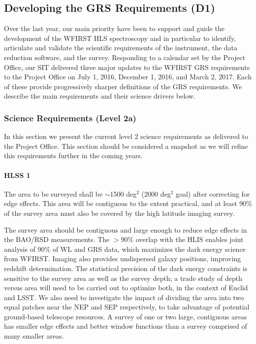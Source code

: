  \subsection{Developing the GRS Requirements (D1)}

 \begin{summaryii}
   Over the last year, our main priority have been to support and guide the development of the WFIRST HLS spectroscopy and in particular to identify, articulate and validate the scientific requirements of the instrument, the data reduction software, and the survey. Responding to a calendar set by the Project Office, our SIT delivered three major updates to the WFIRST GRS requirements to the Project Office on July 1, 2016, December 1, 2016, and March 2, 2017. Each of these provide progressively sharper definitions of the  GRS requirements. We describe the main requirements and their science drivers below.
 \end{summaryii}


 \subsubsection{Science Requirements (Level 2a)} In this section we present the current level 2 science requirements as delivered to the Project Office. This section should be considered a snapshot as we will refine this requirements further in the coming years.
\label{sec:sr2a_grs}

 \paragraph{HLSS 1} The area to be surveyed shall be $\sim$1500 deg$^2$ (2000 deg$^2$ goal) after correcting for edge effects.  This area will be contiguous to the extent practical, and at least 90\% of the survey area must also be covered by the high latitude imaging survey.

 The survey area should be contiguous and large enough to reduce edge effects in
 the BAO/RSD measurements.  The $>90\%$ overlap with the HLIS enables joint
 analysis of 90\% of WL and GRS data, which maximizes the dark energy science
 from WFIRST.  Imaging also provides undispersed galaxy positions, improving
 redshift determination.  The statistical precision of the dark energy
 constraints is sensitive to the survey area as well as the survey depth; a trade
 study of depth versus area will need to be carried out to optimize both, in the
 context of Euclid and LSST. We also need to investigate the impact of dividing
 the area into two equal patches near the NEP and SEP respectively, to take
 advantage of potential ground-based telescope resources.  A survey of one or
 two large, contiguous areas has smaller edge effects and better window functions
 than a survey comprised of many smaller areas.


